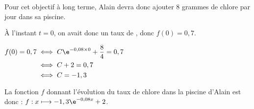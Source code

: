 \begin{enumerate}
\begin{enumerate}
Pour cet objectif à long terme, Alain devra donc ajouter 8 grammes de chlore par jour dans sa piscine.

À l'instant $t = 0$, on avait donc un	taux de , donc $f(0) = 0,7$.

$\aligned[t] f(0) = 0,7 &\iff C\e^{-0,08\times 0} + \dfrac{8}{4} =0,7\\
&\iff C + 2 = 0,7\\
&\iff C = -1,3\endaligned$

La fonction $f$ donnant l'évolution du taux de chlore dans la piscine d'Alain est donc :
\quad$f :x \longmapsto -1,3\e^{-0,08x} + 2$.
	\end{enumerate}
\end{enumerate}

\medskip

